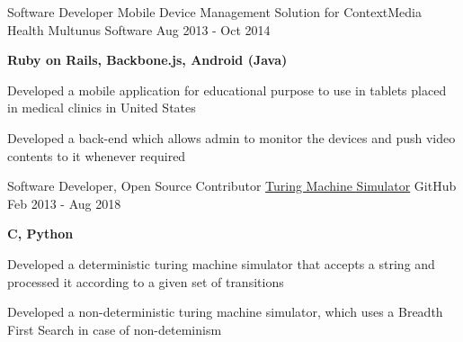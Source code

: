 \begin{cventries}
{\begin{cvitems}
      \end{cvitems} 
    }
  \cventry
    {Software Developer}
    {Mobile Device Management Solution for ContextMedia Health}
    {Multunus Software}
    {Aug 2013 - Oct 2014}
    {
      \begin{cvitems}
        \item {\textbf{Ruby on Rails, Backbone.js, Android (Java)}}
        \item {Developed a mobile application for educational purpose to use in tablets placed in medical clinics in United States}
        \item {Developed a back-end which allows admin to monitor the devices and push video contents to it whenever required}
      \end{cvitems}
    }
  \cventry
    {Software Developer, Open Source Contributor}
    {\href{https://github.com/yedhukrishnan/turing-machine}{Turing Machine Simulator}}
    {GitHub}
    {Feb 2013 - Aug 2018}
    {
      \begin{cvitems}
        \item {\textbf{C, Python}}
        \item {Developed a deterministic turing machine simulator that accepts a string and processed it according to a given set of transitions}
        \item {Developed a non-deterministic turing machine simulator, which uses a Breadth First Search in case of non-deteminism}
      \end{cvitems}
    }
\end{cventries}